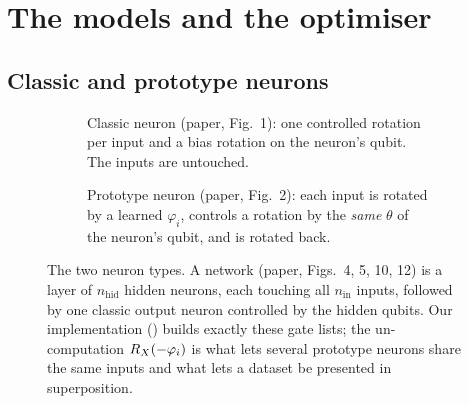\section{The models and the optimiser}
\label{sec:models}

\subsection{Classic and prototype neurons}
\label{sec:neurons}

\begin{figure}[t]
\centering
\begin{subfigure}[b]{0.36\textwidth}\centering
{}
\caption{Classic neuron (paper, Fig.~1): one controlled rotation per input and a bias
rotation on the neuron's qubit.  The inputs are untouched.}
\end{subfigure}\hfill
\begin{subfigure}[b]{0.6\textwidth}\centering
{}
\caption{Prototype neuron (paper, Fig.~2): each input is rotated by a learned $\varphi_i$,
controls a rotation by the \emph{same} $\theta$ of the neuron's qubit, and is rotated back.}
\end{subfigure}
\caption{The two neuron types.  A network (paper, Figs.~4, 5, 10, 12) is a layer of
$n_{\mathrm{hid}}$ hidden neurons, each touching all $n_{\mathrm{in}}$ inputs, followed by one
classic output neuron controlled by the hidden qubits.  Our implementation
() builds exactly these gate lists; the un-computation
$R_X(-\varphi_i)$ is what lets several prototype neurons share the same inputs and what lets a
dataset be presented in superposition.}
\label{fig:circuits}
\end{figure}

